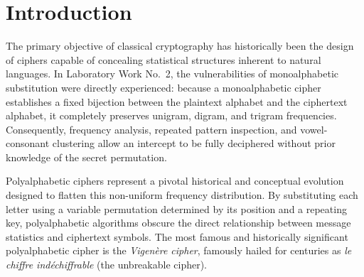 \documentclass[11pt,a4paper]{article}
\begin{document}
\setcounter{page}{2}
\tableofcontents
\newpage

\section*{Introduction}

The primary objective of classical cryptography has historically been the design of ciphers capable of concealing statistical structures inherent to natural languages. In Laboratory Work No.~2, the vulnerabilities of monoalphabetic substitution were directly experienced: because a monoalphabetic cipher establishes a fixed bijection between the plaintext alphabet and the ciphertext alphabet, it completely preserves unigram, digram, and trigram frequencies. Consequently, frequency analysis, repeated pattern inspection, and vowel-consonant clustering allow an intercept to be fully deciphered without prior knowledge of the secret permutation.

Polyalphabetic ciphers represent a pivotal historical and conceptual evolution designed to flatten this non-uniform frequency distribution. By substituting each letter using a variable permutation determined by its position and a repeating key, polyalphabetic algorithms obscure the direct relationship between message statistics and ciphertext symbols. The most famous and historically significant polyalphabetic cipher is the \textit{Vigen\`ere cipher}, famously hailed for centuries as \textit{le chiffre ind\'echiffrable} (the unbreakable cipher).
\end{document}
